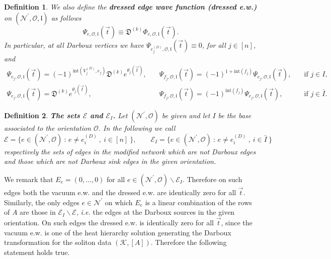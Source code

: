 \documentclass[11pt]{amsart}
\theoremstyle{plain}
\numberwithin{equation}{section}
\newtheorem{definition}{Definition}[subsection]
\begin{document}
\begin{definition}
We also define the \textbf{dressed edge wave function (dressed e.w.)} on $({\mathcal N}^{\prime}, \mathcal O, \mathfrak l)$ as follows
\begin{equation}\label{eq:KPvfN}
\Psi_{e, \mathcal O,\mathfrak l} (\vec t) \equiv {\mathfrak D}^{(k)} \Phi_{e, \mathcal O,\mathfrak l} (\vec t).
\end{equation}
In particular, at all Darboux vertices we have $\Psi_{e^{(D)}_j, \mathcal O,\mathfrak l} (\vec t) \equiv 0$, for all $j\in [n]$, 
and
\begin{equation}\label{eq:KP_wf_source}
\begin{array}{lll}
\Psi_{e_j, \mathcal O,\mathfrak l} (\vec t) =(-1)^{\mbox{int}(V^{(D)}_{j},e_{j})} {\mathfrak D}^{(k)} e^{\theta_{j}(\vec t)},&\quad
\Psi_{f_j, \mathcal O,\mathfrak l} (\vec t) = (-1)^{1+\mbox{int}(f_j)}\Psi_{e_j, \mathcal O,\mathfrak l} (\vec t), 
&\quad\mbox {if } j\in I, 
\\
\Psi_{e_j, \mathcal O,\mathfrak l} (\vec t) ={\mathfrak D}^{(k)} e^{\theta_{j}(\vec t)}, &\quad
\Psi_{f_j, \mathcal O,\mathfrak l} (\vec t) = (-1)^{\mbox{int}(f_j)}\Psi_{e_j, \mathcal O,\mathfrak l} (\vec t), 
&\quad\mbox {if } j\in \bar I.
\end{array}
\end{equation}
\end{definition}

\begin{definition}\label{def:zeros_vvw}\textbf{The sets $\mathcal E$ and $\mathcal E_I$.} 
Let $(\mathcal N^{\prime}, \mathcal O)$ be given and let $I$ be the base associated to the orientation $\mathcal O$.
In the following we call
\[
\mathcal E = \{ e \in ({\mathcal N}^{\prime}, {\mathcal O}) \ : \, e\ne e^{(D)}_i \ , \ i\in [n] \ \}, \quad\quad \mathcal E_I = \{ e \in ({\mathcal N}^{\prime}, {\mathcal O}) \ : \, e\ne e^{(D)}_i \ , \ i\in \bar I \ \}
\]
respectively the sets of edges in the modified network which are not Darboux edges and those which are not Darboux sink edges in the given orientation.
\end{definition}

We remark that  $E_e=(0,\dots,0)$ for all $ e \in  (\mathcal N^{\prime}, \mathcal O)\backslash \mathcal E_I$. Therefore on such edges both the vacuum e.w. and the dressed e.w. are identically zero for all $\vec t$. 
Similarly, the only edges $e\in \mathcal N^{\prime}$ on which $E_e$ is a linear combination of the rows of $A$
are those in $\mathcal E_I \backslash \mathcal E$, {\sl i.e.} the edges at the Darboux sources in the given orientation.
On such edges the dressed e.w. is identically zero for all $\vec t$, since the vacuum e.w. is one of the heat hierarchy solution generating the Darboux transformation for the soliton data $(\mathcal K,[A])$. Therefore the following statement holds true.
\end{document}

